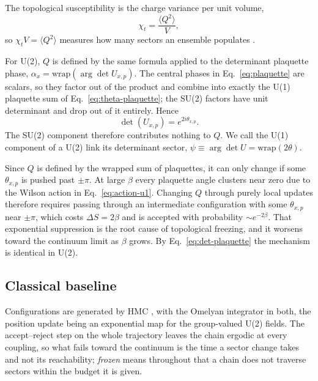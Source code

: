 \documentclass[prd, twocolumn, superscriptaddress, nofootinbib,floatfix]{revtex4-2}
\DeclareRobustCommand{\Eq}[1]{Eq.~\eqref{eq:#1}}
\begin{document}
The topological susceptibility is the charge variance per unit volume,
\begin{equation}
    \chi_t = \frac{\langle Q^2\rangle}{V},
    \label{eq:chi-t}
\end{equation}
so $\chi_t V = \langle Q^2\rangle$ measures how many sectors an ensemble
populates \cite{bonatirossi2019}.

For U(2), $Q$ is defined by the same formula applied to the determinant plaquette
phase, $\alpha_x = \mathrm{wrap}(\arg\det U_{x,p})$. The central phases in
\Eq{plaquette} are scalars, so they factor out of the product and combine into
exactly the U(1) plaquette sum of \Eq{theta-plaquette}; the SU(2) factors have
unit determinant and drop out of it entirely. Hence
\begin{equation}
    \det(U_{x,p})=e^{2i\theta_{x,p}}.
    \label{eq:det-plaquette}
\end{equation}
The SU(2) component therefore contributes nothing to $Q$. We call the U(1) component of a U(2) link
its determinant sector, $\psi \equiv \arg\det U = \mathrm{wrap}(2\theta)$.

Since $Q$ is defined by the wrapped sum of plaquettes, it can only change if some
$\theta_{x,p}$ is pushed past $\pm\pi$. At large $\beta$ every plaquette angle
clusters near zero due to the Wilson action in \Eq{action-u1}.
Changing $Q$ through purely local updates therefore requires passing through an
intermediate configuration with some $\theta_{x,p}$ near $\pm\pi$, which costs
$\Delta S = 2\beta$ and is accepted with probability $\sim e^{-2\beta}$. That exponential
suppression is the root cause of topological freezing, and it worsens toward the
continuum limit as $\beta$ grows. By \Eq{det-plaquette} the mechanism
is identical in U(2).

\subsection{Classical baseline}
\label{sec:instanton_updates_classical}
Configurations are generated by HMC \cite{duane1987,neal2011}, with the Omelyan
integrator \cite{omelyan2003} in both, the position update being an exponential
map for the
group-valued U(2) fields. The accept--reject step on the whole trajectory leaves
the chain ergodic at every coupling, so what fails toward the continuum is the
time a sector change takes and not its reachability; \emph{frozen} means
throughout that a chain does not traverse sectors within the budget it is given.
\end{document}
